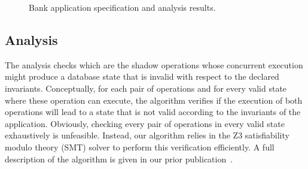 \documentclass[11pt,dvipdfm]{article}
\begin{document}
\begin{figure}[t!]
\centering
 \begin{minipage}[b]{0.45\columnwidth}
\centering
{}
\end{minipage}
\hfill
 \begin{minipage}[b]{0.53\columnwidth}
\centering
{}
\end{minipage}
\caption{Bank application specification and analysis results.}
\end{figure}

\subsection{Analysis}
The analysis checks which are the shadow operations
whose concurrent execution might produce a
database state that is invalid with respect to the declared invariants.
Conceptually, for each pair of operations and for every valid state where
these operation can execute, the algorithm verifies if the execution of both
operations will lead to a state that is not valid according to the invariants
of the application.
Obviously, checking every pair of operations in every valid state
exhaustively is unfeasible. Instead, our algorithm relies in the
Z3 satisfiability modulo theory (SMT) solver to perform this verification
efficiently.
A full description of the algorithm is given in our prior publication~\cite{Balegas2015Indigo}.
\end{document}
